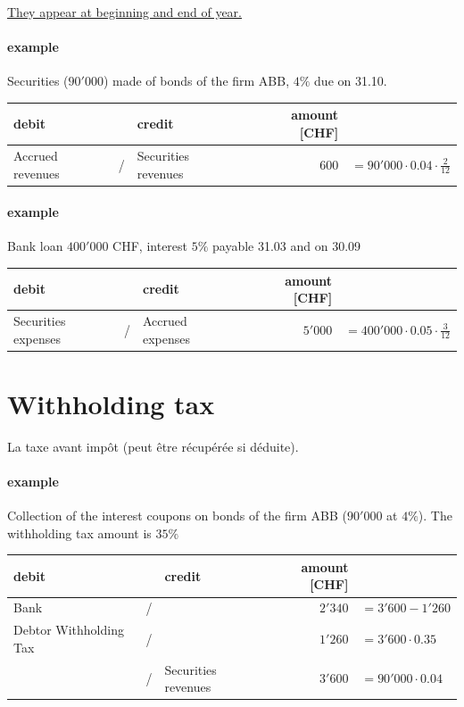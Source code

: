 \documentclass[a4paper] {scrartcl}
\begin{document}
\underline{They appear at beginning and end of year.}

\paragraph{example} Securities ($90'000$) made of bonds of the firm ABB, $4\%$ due on 31.10.\\

\begin{tabular}{lllrl}
	\textbf{debit} & & \textbf{credit} & \textbf{amount} [CHF]&\\
	\hline
	Accrued revenues & / &  Securities revenues & $600$&$ = 90'000\cdot0.04\cdot\frac{2}{12}$\\
\end{tabular}

\paragraph{example} Bank loan $400'000$ CHF, interest $5\%$ payable 31.03 and on 30.09\\

\begin{tabular}{lllrl}
	\textbf{debit} & & \textbf{credit} & \textbf{amount} [CHF]&\\
	\hline
	 Securities expenses & / &  Accrued expenses & $5'000$&$ = 400'000\cdot0.05\cdot\frac{3}{12}$\\
\end{tabular}

\section{Withholding tax}
La taxe avant impôt (peut être récupérée si déduite).

\paragraph{example} Collection of the interest coupons on bonds of the firm ABB ($90'000$ at $4\%$). The withholding tax amount is $35\%$\\

\begin{tabular}{lllrl}
	\textbf{debit} & & \textbf{credit} & \textbf{amount} [CHF]&\\
	\hline
	Bank & / &   & $2'340$&$ =3'600-1'260$\\
	Debtor Withholding Tax & / &  & $1'260$&$ =3'600\cdot0.35$\\
	 & / &  Securities revenues & $3'600$&$ = 90'000\cdot0.04$\\
\end{tabular}
\end{document}
